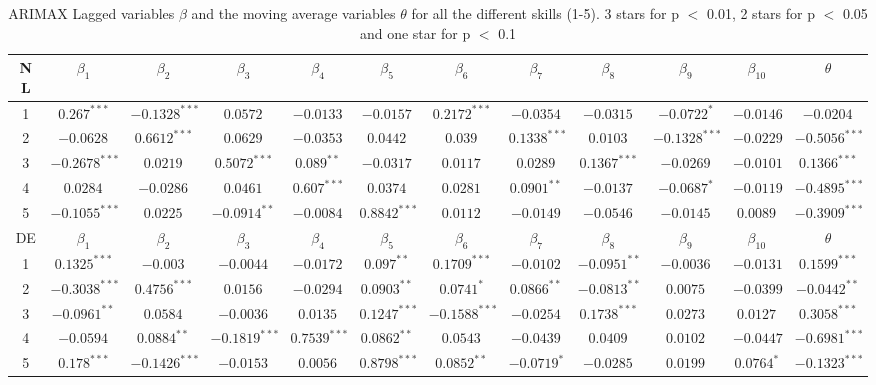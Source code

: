 \begin{landscape}
\begin{table}[]
    \footnotesize
    \centering
    \begin{tabular}{|c|c c c c c c c c c c c|}\hline
        NL & $\beta_{1}$ & $\beta_{2}$ & $\beta_{3}$ & $\beta_{4}$ & $\beta_{5}$ & $\beta_{6}$ & $\beta_{7}$ & $\beta_{8}$ & $\beta_{9}$ & $\beta_{10}$ & $\theta$ \\\hline
        1 & $0.267^{***}$ & $-0.1328^{***}$ & $0.0572^{}$ & $-0.0133^{}$ & $-0.0157^{}$ & $0.2172^{***}$ & $-0.0354^{}$ & $-0.0315^{}$ & $-0.0722^{*}$ & $-0.0146^{}$ & $-0.0204^{}$\\
        2 & $-0.0628^{}$ & $0.6612^{***}$ & $0.0629^{}$ & $-0.0353^{}$ & $0.0442^{}$ & $0.039^{}$ & $0.1338^{***}$ & $0.0103^{}$ & $-0.1328^{***}$ & $-0.0229^{}$ & $-0.5056^{***}$\\
        3 & $-0.2678^{***}$ & $0.0219^{}$ & $0.5072^{***}$ & $0.089^{**}$ & $-0.0317^{}$ & $0.0117^{}$ & $0.0289^{}$ & $0.1367^{***}$ & $-0.0269^{}$ & $-0.0101^{}$ & $0.1366^{***}$\\
        4 & $0.0284^{}$ & $-0.0286^{}$ & $0.0461^{}$ & $0.607^{***}$ & $0.0374^{}$ & $0.0281^{}$ & $0.0901^{**}$ & $-0.0137^{}$ & $-0.0687^{*}$ & $-0.0119^{}$ & $-0.4895^{***}$\\
        5 & $-0.1055^{***}$ & $0.0225^{}$ & $-0.0914^{**}$ & $-0.0084^{}$ & $0.8842^{***}$ & $0.0112^{}$ & $-0.0149^{}$ & $-0.0546^{}$ & $-0.0145^{}$ & $0.0089^{}$ & $-0.3909^{***}$\\\hline
        DE & $\beta_{1}$ & $\beta_{2}$ & $\beta_{3}$ & $\beta_{4}$ & $\beta_{5}$ & $\beta_{6}$ & $\beta_{7}$ & $\beta_{8}$ & $\beta_{9}$ & $\beta_{10}$ & $\theta$ \\\hline
        1 & $0.1325^{***}$ & $-0.003^{}$ & $-0.0044^{}$ & $-0.0172^{}$ & $0.097^{**}$ & $0.1709^{***}$ & $-0.0102^{}$ & $-0.0951^{**}$ & $-0.0036^{}$ & $-0.0131^{}$ & $0.1599^{***}$\\
        2 & $-0.3038^{***}$ & $0.4756^{***}$ & $0.0156^{}$ & $-0.0294^{}$ & $0.0903^{**}$ & $0.0741^{*}$ & $0.0866^{**}$ & $-0.0813^{**}$ & $0.0075^{}$ & $-0.0399^{}$ & $-0.0442^{**}$\\
        3 & $-0.0961^{**}$ & $0.0584^{}$ & $-0.0036^{}$ & $0.0135^{}$ & $0.1247^{***}$ & $-0.1588^{***}$ & $-0.0254^{}$ & $0.1738^{***}$ & $0.0273^{}$ & $0.0127^{}$ & $0.3058^{***}$\\
        4 & $-0.0594^{}$ & $0.0884^{**}$ & $-0.1819^{***}$ & $0.7539^{***}$ & $0.0862^{**}$ & $0.0543^{}$ & $-0.0439^{}$ & $0.0409^{}$ & $0.0102^{}$ & $-0.0447^{}$ & $-0.6981^{***}$\\
        5 & $0.178^{***}$ & $-0.1426^{***}$ & $-0.0153^{}$ & $0.0056^{}$ & $0.8798^{***}$ & $0.0852^{**}$ & $-0.0719^{*}$ & $-0.0285^{}$ & $0.0199^{}$ & $0.0764^{*}$ & $-0.1323^{***}$\\
        \hline
    \end{tabular}
    \caption{ARIMAX Lagged variables $\beta$ and the moving average variables $\theta$ for all the different skills (1-5). 3 stars for p $<$ 0.01, 2 stars for p $<$ 0.05 and one star for p $<$ 0.1}
    \label{tab:varimax_lagged_variables}
\end{table}
\end{landscape}

